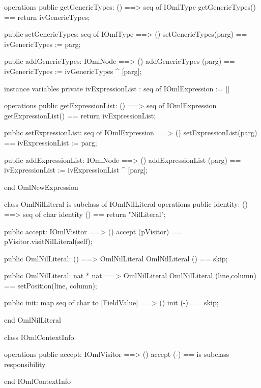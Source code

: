 \begin{vdm_al}
operations
  public getGenericTypes: () ==> seq of IOmlType
  getGenericTypes() == return ivGenericTypes;

  public setGenericTypes: seq of IOmlType ==> ()
  setGenericTypes(parg) == ivGenericTypes := parg;

  public addGenericTypes: IOmlNode ==> ()
  addGenericTypes (parg) == ivGenericTypes := ivGenericTypes ^ [parg];

instance variables
  private ivExpressionList : seq of IOmlExpression := []

operations
  public getExpressionList: () ==> seq of IOmlExpression
  getExpressionList() == return ivExpressionList;

  public setExpressionList: seq of IOmlExpression ==> ()
  setExpressionList(parg) == ivExpressionList := parg;

  public addExpressionList: IOmlNode ==> ()
  addExpressionList (parg) == ivExpressionList := ivExpressionList ^ [parg];

end OmlNewExpression
\end{vdm_al}

\begin{vdm_al}
class OmlNilLiteral is subclass of IOmlNilLiteral
operations
  public identity: () ==> seq of char
  identity () == return "NilLiteral";

  public accept: IOmlVisitor ==> ()
  accept (pVisitor) == pVisitor.visitNilLiteral(self);

  public OmlNilLiteral:
    () ==> OmlNilLiteral
  OmlNilLiteral () == 
    skip;

  public OmlNilLiteral:
    nat *
    nat ==> OmlNilLiteral
  OmlNilLiteral (line,column) == 
    setPosition(line, column);

  public init: map seq of char to [FieldValue] ==> ()
  init (-) == skip;

end OmlNilLiteral
\end{vdm_al}

\begin{vdm_al}
class IOmlContextInfo

operations
  public accept: IOmlVisitor ==> ()
  accept (-) == is subclass responsibility

end IOmlContextInfo
\end{vdm_al}

